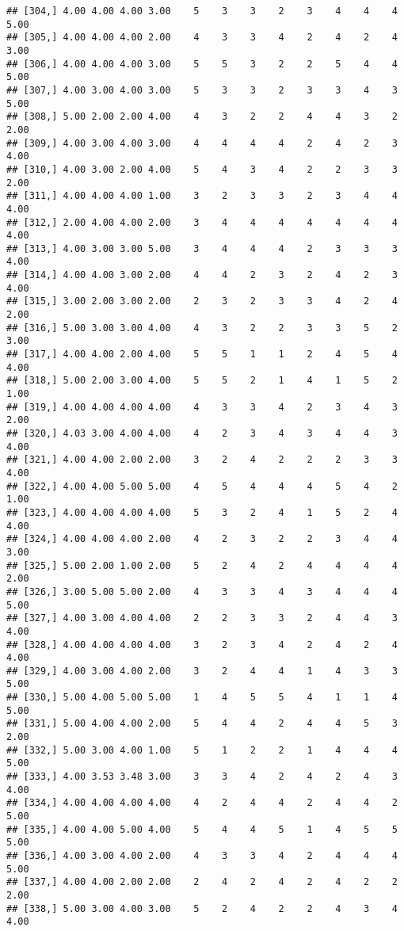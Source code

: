 \documentclass[]{article}
\begin{document}
\begin{verbatim}
## [304,] 4.00 4.00 4.00 3.00    5    3    3    2    3    4    4    4 5.00
## [305,] 4.00 4.00 4.00 2.00    4    3    3    4    2    4    2    4 3.00
## [306,] 4.00 4.00 4.00 3.00    5    5    3    2    2    5    4    4 5.00
## [307,] 4.00 3.00 4.00 3.00    5    3    3    2    3    3    4    3 5.00
## [308,] 5.00 2.00 2.00 4.00    4    3    2    2    4    4    3    2 2.00
## [309,] 4.00 3.00 4.00 3.00    4    4    4    4    2    4    2    3 4.00
## [310,] 4.00 3.00 2.00 4.00    5    4    3    4    2    2    3    3 2.00
## [311,] 4.00 4.00 4.00 1.00    3    2    3    3    2    3    4    4 4.00
## [312,] 2.00 4.00 4.00 2.00    3    4    4    4    4    4    4    4 4.00
## [313,] 4.00 3.00 3.00 5.00    3    4    4    4    2    3    3    3 4.00
## [314,] 4.00 4.00 3.00 2.00    4    4    2    3    2    4    2    3 4.00
## [315,] 3.00 2.00 3.00 2.00    2    3    2    3    3    4    2    4 2.00
## [316,] 5.00 3.00 3.00 4.00    4    3    2    2    3    3    5    2 3.00
## [317,] 4.00 4.00 2.00 4.00    5    5    1    1    2    4    5    4 4.00
## [318,] 5.00 2.00 3.00 4.00    5    5    2    1    4    1    5    2 1.00
## [319,] 4.00 4.00 4.00 4.00    4    3    3    4    2    3    4    3 2.00
## [320,] 4.03 3.00 4.00 4.00    4    2    3    4    3    4    4    3 4.00
## [321,] 4.00 4.00 2.00 2.00    3    2    4    2    2    2    3    3 4.00
## [322,] 4.00 4.00 5.00 5.00    4    5    4    4    4    5    4    2 1.00
## [323,] 4.00 4.00 4.00 4.00    5    3    2    4    1    5    2    4 4.00
## [324,] 4.00 4.00 4.00 2.00    4    2    3    2    2    3    4    4 3.00
## [325,] 5.00 2.00 1.00 2.00    5    2    4    2    4    4    4    4 2.00
## [326,] 3.00 5.00 5.00 2.00    4    3    3    4    3    4    4    4 5.00
## [327,] 4.00 3.00 4.00 4.00    2    2    3    3    2    4    4    3 4.00
## [328,] 4.00 4.00 4.00 4.00    3    2    3    4    2    4    2    4 4.00
## [329,] 4.00 3.00 4.00 2.00    3    2    4    4    1    4    3    3 5.00
## [330,] 5.00 4.00 5.00 5.00    1    4    5    5    4    1    1    4 5.00
## [331,] 5.00 4.00 4.00 2.00    5    4    4    2    4    4    5    3 2.00
## [332,] 5.00 3.00 4.00 1.00    5    1    2    2    1    4    4    4 5.00
## [333,] 4.00 3.53 3.48 3.00    3    3    4    2    4    2    4    3 4.00
## [334,] 4.00 4.00 4.00 4.00    4    2    4    4    2    4    4    2 5.00
## [335,] 4.00 4.00 5.00 4.00    5    4    4    5    1    4    5    5 5.00
## [336,] 4.00 3.00 4.00 2.00    4    3    3    4    2    4    4    4 5.00
## [337,] 4.00 4.00 2.00 2.00    2    4    2    4    2    4    2    2 2.00
## [338,] 5.00 3.00 4.00 3.00    5    2    4    2    2    4    3    4 4.00

\end{verbatim}
\end{document}
